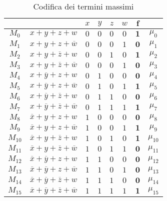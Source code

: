 \documentclass[a4paper]{extarticle}
\begin{document}
\begin{table}[H]
  \centering
  \noindent
  \begin{tabular}{c|c||cccc||c|c}
    $ $ & $ $ & $x$ & $y$ & $z$ & $w$ & $\boldsymbol{f}$\\
    \hline
    $M_0$ & $x + y + z + w$ & $0$ & $0$ & $0$ & $0$ & $\boldsymbol{1}$ & $\mu_0$\\
    $M_1$ & $x + y + z + \overline{w}$ & $0$ & $0$ & $0$ & $1$ & $\boldsymbol{0}$ & $\mu_1$\\
    $M_2$ & $x + y + \overline{z} + w$ & $0$ & $0$ & $1$ & $0$ & $\boldsymbol{1}$ & $\mu_2$\\
    $M_3$ & $x + y + \overline{z} + \overline{w}$ & $0$ & $0$ & $0$ & $1$ & $\boldsymbol{0}$ & $\mu_3$\\
    $M_4$ & $x + \overline{y} + z + w$ & $0$ & $1$ & $0$ & $0$ & $\boldsymbol{0}$ & $\mu_4$\\
    $M_5$ & $x + \overline{y} + z + \overline{w}$ & $0$ & $1$ & $0$ & $1$ & $\boldsymbol{1}$ & $\mu_5$\\
    $M_6$ & $x + \overline{y} + \overline{z} + w$ & $0$ & $1$ & $1$ & $0$ & $\boldsymbol{0}$ & $\mu_6$\\
    $M_7$ & $x + \overline{y} + \overline{z} + \overline{w}$ & $0$ & $1$ & $1$ & $1$ & $\boldsymbol{1}$ & $\mu_7$\\
    $M_8$ & $\overline{x} + y + z + w$ & $1$ & $0$ & $0$ & $0$ & $\boldsymbol{0}$ & $\mu_8$\\
    $M_9$ & $\overline{x} + y + z + \overline{w}$ & $1$ & $0$ & $0$ & $1$ & $\boldsymbol{1}$ & $\mu_9$\\
    $M_{10}$ & $\overline{x} + y + \overline{z} + w$ & $1$ & $0$ & $1$ & $0$ & $\boldsymbol{1}$ & $\mu_{10}$\\
    $M_{11}$ & $\overline{x} + y + \overline{z} + \overline{w}$ & $1$ & $0$ & $1$ & $1$ & $\boldsymbol{0}$ & $\mu_{11}$\\
    $M_{12}$ & $\overline{x} + \overline{y} + z + w$ & $1$ & $1$ & $0$ & $0$ & $\boldsymbol{0}$ & $\mu_{12}$\\
    $M_{13}$ & $\overline{x} + \overline{y} + z + \overline{w}$ & $1$ & $1$ & $0$ & $1$ & $\boldsymbol{0}$ & $\mu_{13}$\\
    $M_{14}$ & $\overline{x} + \overline{y} + \overline{z} + w$ & $1$ & $1$ & $1$ & $0$ & $\boldsymbol{0}$ & $\mu_{14}$\\
    $M_{15}$ & $\overline{x} + \overline{y} + \overline{z} + \overline{w}$ & $1$ & $1$ & $1$ & $1$ & $\boldsymbol{1}$ & $\mu_{15}$\\
  \end{tabular}
  \caption{Codifica dei termini massimi}
  \label{tab:codifica_termini_massimi}
\end{table}
\end{document}
